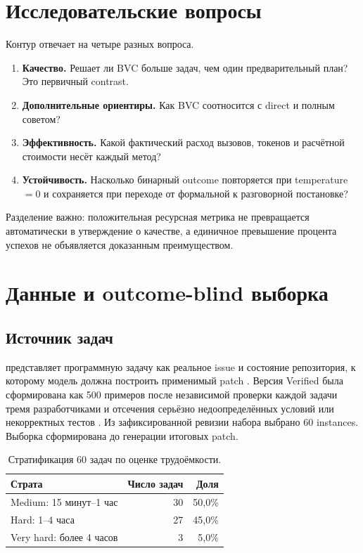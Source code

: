 \documentclass[11pt]{article}
\begin{document}
\section{Исследовательские вопросы}

Контур отвечает на четыре разных вопроса.

\begin{enumerate}
  \item \textbf{Качество.} Решает ли BVC больше задач, чем один
        предварительный план? Это первичный contrast.
  \item \textbf{Дополнительные ориентиры.} Как BVC соотносится с direct и
        полным советом?
  \item \textbf{Эффективность.} Какой фактический расход вызовов, токенов и
        расчётной стоимости несёт каждый метод?
  \item \textbf{Устойчивость.} Насколько бинарный outcome повторяется при
        temperature \(=0\) и сохраняется при переходе от формальной к
        разговорной постановке?
\end{enumerate}

Разделение важно: положительная ресурсная метрика не превращается
автоматически в утверждение о качестве, а единичное превышение процента
успехов не объявляется доказанным преимуществом.

\section{Данные и outcome-blind выборка}

\subsection{Источник задач}

\dataset{} представляет программную задачу как реальное issue и состояние
репозитория, к которому модель должна построить применимый patch
\cite{jimenez2024swebench}. Версия Verified была сформирована как 500
примеров после независимой проверки каждой задачи тремя разработчиками и
отсечения серьёзно недоопределённых условий или некорректных тестов
\cite{openai2024verified}. Из зафиксированной ревизии набора
 выбрано 60 instances.
Выборка сформирована до генерации итоговых patch.

\begin{table}[H]
\centering
\caption{Стратификация 60 задач по оценке трудоёмкости.}
\label{tab:strata}
\begin{tabular}{@{}lrr@{}}
\toprule
Страта & Число задач & Доля\\
\midrule
Medium: 15 минут--1 час & 30 & 50,0\%\\
Hard: 1--4 часа & 27 & 45,0\%\\
Very hard: более 4 часов & 3 & 5,0\%\\
\bottomrule
\end{tabular}
\end{table}
\end{document}
